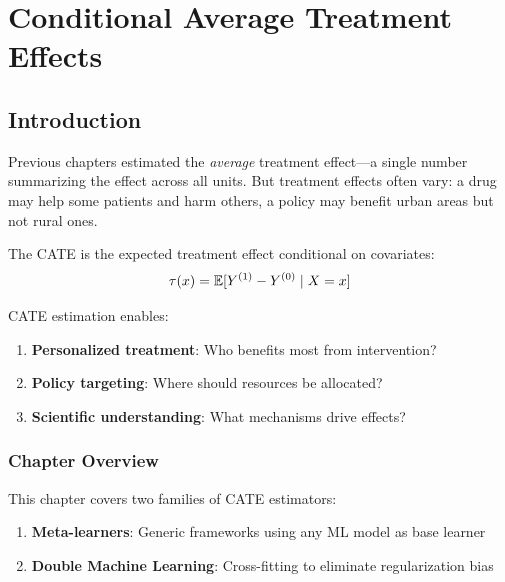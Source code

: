 \chapter{Conditional Average Treatment Effects}
\label{ch:cate}


\section{Introduction}
\label{sec:cate_intro}

Previous chapters estimated the \emph{average} treatment effect---a single number summarizing the effect across all units. But treatment effects often vary: a drug may help some patients and harm others, a policy may benefit urban areas but not rural ones.

\begin{definition}
The CATE is the expected treatment effect conditional on covariates:
\begin{equation}
\tau(x) = \mathbb{E}[Y^{(1)} - Y^{(0)} \mid X = x]
\label{eq:cate_def}
\end{equation}
\end{definition}

CATE estimation enables:
\begin{enumerate}
    \item \textbf{Personalized treatment}: Who benefits most from intervention?
    \item \textbf{Policy targeting}: Where should resources be allocated?
    \item \textbf{Scientific understanding}: What mechanisms drive effects?
\end{enumerate}

\subsection{Chapter Overview}

This chapter covers two families of CATE estimators:
\begin{enumerate}
    \item \textbf{Meta-learners}: Generic frameworks using any ML model as base learner
    \item \textbf{Double Machine Learning}: Cross-fitting to eliminate regularization bias
\end{enumerate}

